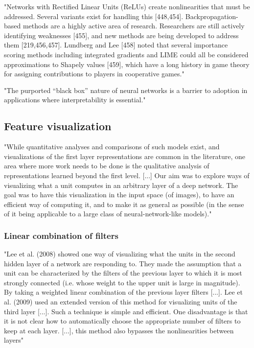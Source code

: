 "Networks with Rectified Linear Units (ReLUs) create nonlinearities that must be addressed. Several variants exist for handling this [448,454]. Backpropagation-based methods are a highly active area of research. Researchers are still actively identifying weaknesses [455], and new methods are being developed to address them [219,456,457]. Lundberg and Lee [458] noted that several importance scoring methods including integrated gradients and LIME could all be considered approximations to Shapely values [459], which have a long history in game theory for assigning contributions to players in cooperative games." \cite{Ching2017}

"The purported “black box” nature of neural networks is a barrier to adoption in applications where interpretability is essential." \cite{Shrikumar2017}

	\subsection{Feature visualization}
	
	"While quantitative analyses and comparisons of such models exist, and visualizations of the first layer representations are common in the literature, one area where more work needs to be done is the qualitative analysis of representations learned beyond the first level. [...] Our aim was to explore ways of visualizing what a unit computes in an arbitrary layer of a deep network. The goal was to have this visualization in the input space (of images), to have an efficient way of computing it, and to make it as general as possible (in the sense of it being applicable to a large class of neural-network-like models)." \cite{Erhan2009}
	
		\subsubsection{Linear combination of filters}
		"Lee et al. (2008) showed one way of visualizing what the units in the second hidden layer of a network are responding to. They made the assumption that a unit can be characterized by the filters of the previous layer to which it is most strongly connected (i.e. whose weight to the upper unit is large in magnitude). By taking a weighted linear combination of the previous layer filters [...].
		Lee et al. (2009) used an extended version of this method for visualizing units of the third layer [...].
		Such a technique is simple and efficient. One disadvantage is that it is not clear how to automatically choose the appropriate number of filters to keep at each layer. [...], this method also bypasses the nonlinearities between layers" \cite{Erhan2009}
		
